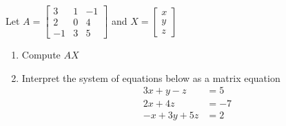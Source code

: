 \begin{applicationActivities}{1}{21}
\begin{activity}{5}
Let $A=\begin{bmatrix} 3 & 1 & -1 \\ 2 & 0 & 4 \\ -1 & 3 & 5 \end{bmatrix}$ and $X=\begin{bmatrix} x \\ y \\ z \end{bmatrix}$
\begin{enumerate}
\item Compute $AX$
\item Interpret the system of equations below as a matrix equation
\begin{align*}
3x+y-z &= 5 \\ 2x+4z &= -7 \\ -x+3y+5z &=2
\end{align*}
\end{enumerate}
\end{activity}

\end{applicationActivities}
